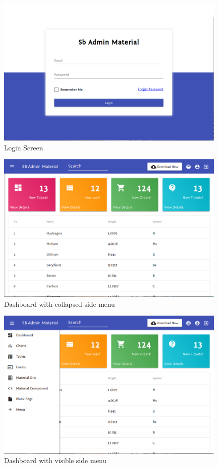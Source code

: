 \begin{figure}
  \centering
  \includegraphics[width=.8\textwidth]{images/sbadmin/login}
  \caption{Login Screen}\label{fig:login}
\end{figure}
\begin{figure}
  \centering
  \includegraphics[width=.8\textwidth]{images/sbadmin/collapsed}
  \caption{Dashboard with collapsed side menu}\label{fig:dash}
\end{figure}
\begin{figure}
  \centering
  \includegraphics[width=.8\textwidth]{images/sbadmin/visible}
  \caption{Dashboard with visible side menu}\label{fig:visible}
\end{figure}

